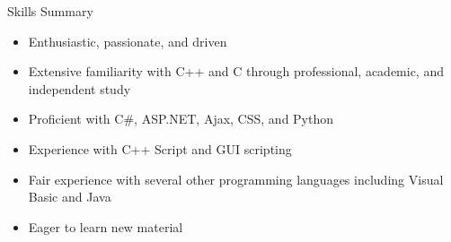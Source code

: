 \documentclass[11pt]{article}
\begin{document}
	\begin{section}{Skills Summary}
	
		\begin{itemize}
			\item Enthusiastic, passionate, and driven
			\item Extensive familiarity with C++ and C through professional, academic, and independent study
			\item Proficient with C\#, ASP.NET, Ajax, CSS, and Python
			\item Experience with C++ Script and GUI scripting
			\item Fair experience with several other programming languages including Visual Basic and Java
			\item Eager to learn new material
		\end{itemize}
		
	\end{section}
		
\end{document}
